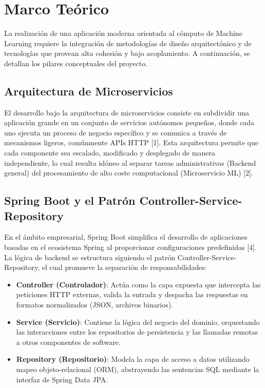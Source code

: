\section{Marco Teórico}\label{sec:introduccion}

La realización de una aplicación moderna orientada al cómputo de Machine Learning requiere la integración de metodologías de diseño arquitectónico y de tecnologías que provean alta cohesión y bajo acoplamiento. A continuación, se detallan los pilares conceptuales del proyecto.

\subsection{Arquitectura de Microservicios}
El desarrollo bajo la arquitectura de microservicios consiste en subdividir una aplicación grande en un conjunto de servicios autónomos pequeños, donde cada uno ejecuta un proceso de negocio específico y se comunica a través de mecanismos ligeros, comúnmente APIs HTTP [1]. Esta arquitectura permite que cada componente sea escalado, modificado y desplegado de manera independiente, lo cual resulta idóneo al separar tareas administrativas (Backend general) del procesamiento de alto coste computacional (Microservicio ML) [2].

\subsection{Spring Boot y el Patrón Controller-Service-Repository}
En el ámbito empresarial, Spring Boot simplifica el desarrollo de aplicaciones basadas en el ecosistema Spring al proporcionar configuraciones predefinidas [4]. La lógica de backend se estructura siguiendo el patrón Controller-Service-Repository, el cual promueve la separación de responsabilidades:
\begin{itemize}
    \item \textbf{Controller (Controlador)}: Actúa como la capa expuesta que intercepta las peticiones HTTP externas, valida la entrada y despacha las respuestas en formatos normalizados (JSON, archivos binarios).
    \item \textbf{Service (Servicio)}: Contiene la lógica del negocio del dominio, orquestando las interacciones entre los repositorios de persistencia y las llamadas remotas a otros componentes de software.
    \item \textbf{Repository (Repositorio)}: Modela la capa de acceso a datos utilizando mapeo objeto-relacional (ORM), abstrayendo las sentencias SQL mediante la interfaz de Spring Data JPA.
\end{itemize}

